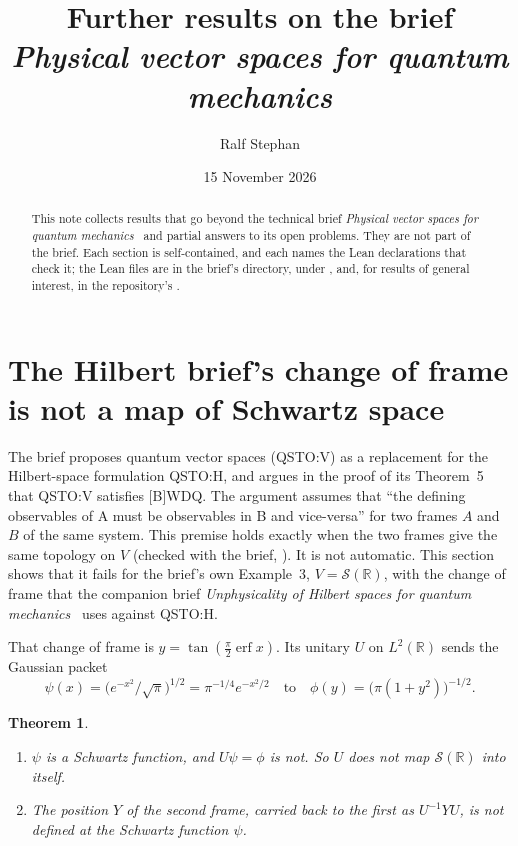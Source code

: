 \documentclass[11pt]{article}
\title{Further results on the brief\\ \emph{Physical vector spaces for quantum mechanics}}
\author{Ralf Stephan}
\date{15 November 2026}
\newtheorem{theorem}{Theorem}[section]
\theoremstyle{definition}
\begin{document}
\maketitle

\begin{abstract}
  This note collects results that go beyond the technical brief \emph{Physical vector spaces for
  quantum mechanics}~\cite{brief} and partial answers to its open problems. They are not part of
  the brief. Each section is self-contained, and each names the Lean declarations that check it;
  the Lean files are in the brief's directory, under ,
  and, for results of general interest, in the repository's .
\end{abstract}

\section{The Hilbert brief's change of frame is not a map of Schwartz space}
\label{sec:schwartz}

The brief proposes quantum vector spaces (QSTO:V) as a replacement for the Hilbert-space
formulation QSTO:H, and argues in the proof of its Theorem~5 that QSTO:V satisfies [B]WDQ. The
argument assumes that ``the defining observables of A must be observables in B and
vice-versa'' for two frames $A$ and $B$ of the same system. This premise holds exactly when the
two frames give the same topology on $V$ (checked with the brief,
). It is not automatic. This section shows
that it fails for the brief's own Example~3, $V = \mathcal S(\mathbb R)$, with the change of
frame that the companion brief \emph{Unphysicality of Hilbert spaces for quantum
mechanics}~\cite{hilbert} uses against QSTO:H.

That change of frame is $y = \tan(\frac\pi2\operatorname{erf}x)$. Its unitary $U$ on
$L^2(\mathbb R)$ sends the Gaussian packet
\[
  \psi(x) = \bigl(e^{-x^2}/\sqrt\pi\bigr)^{1/2} = \pi^{-1/4}e^{-x^2/2}
  \quad\text{to}\quad
  \phi(y) = \bigl(\pi(1+y^2)\bigr)^{-1/2}.
\]

\begin{theorem}\label{thm:schwartz}
  \begin{enumerate}
    \item $\psi$ is a Schwartz function, and $U\psi = \phi$ is not. So $U$ does not map
      $\mathcal S(\mathbb R)$ into itself.
    \item The position $Y$ of the second frame, carried back to the first as $U^{-1}YU$, is not
      defined at the Schwartz function $\psi$.
  \end{enumerate}
\end{theorem}
\end{document}
